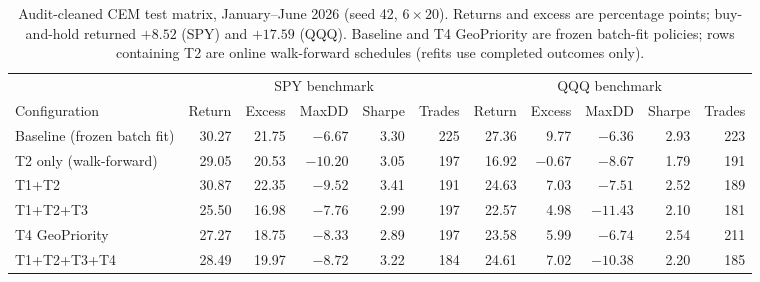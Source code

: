 \begin{table}[t]
\caption{Audit-cleaned CEM test matrix, January--June 2026 (seed 42, $6\times20$). Returns and excess are percentage points; buy-and-hold returned $+8.52$ (SPY) and $+17.59$ (QQQ). Baseline and T4 GeoPriority are frozen batch-fit policies; rows containing T2 are online walk-forward schedules (refits use completed outcomes only).}
\label{tab:cemmatrix}
\centering
\small
\begin{tabular}{lrrrrrrrrrr}
\toprule
& \multicolumn{5}{c}{SPY benchmark} & \multicolumn{5}{c}{QQQ benchmark} \\
\cmidrule(lr){2-6}\cmidrule(lr){7-11}
Configuration & Return & Excess & MaxDD & Sharpe & Trades & Return & Excess & MaxDD & Sharpe & Trades \\
\midrule
Baseline (frozen batch fit) & 30.27 & 21.75 & $-6.67$ & 3.30 & 225 & 27.36 & 9.77 & $-6.36$ & 2.93 & 223 \\
T2 only (walk-forward) & 29.05 & 20.53 & $-10.20$ & 3.05 & 197 & 16.92 & $-0.67$ & $-8.67$ & 1.79 & 191 \\
T1+T2 & 30.87 & 22.35 & $-9.52$ & 3.41 & 191 & 24.63 & 7.03 & $-7.51$ & 2.52 & 189 \\
T1+T2+T3 & 25.50 & 16.98 & $-7.76$ & 2.99 & 197 & 22.57 & 4.98 & $-11.43$ & 2.10 & 181 \\
T4 GeoPriority & 27.27 & 18.75 & $-8.33$ & 2.89 & 197 & 23.58 & 5.99 & $-6.74$ & 2.54 & 211 \\
T1+T2+T3+T4 & 28.49 & 19.97 & $-8.72$ & 3.22 & 184 & 24.61 & 7.02 & $-10.38$ & 2.20 & 185 \\
\bottomrule
\end{tabular}
\end{table}
